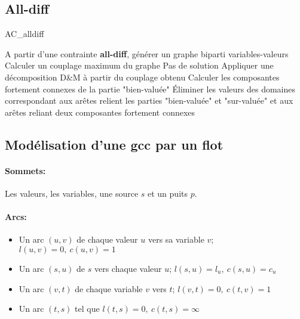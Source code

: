 \documentclass[a4paper,)11pt]{article}
\begin{document}
\subsection*{All-diff}
\begin{algorithm}[H]
\caption{AC\_alldiff}
\label{AC_ad}
\begin{algorithmic}
\STATE A partir d'une contrainte \textbf{all-diff}, générer un graphe biparti variables-valeurs
\STATE Calculer un couplage maximum du graphe
\STATE Pas de solution
\ENDIF
\STATE Appliquer une décomposition D\&M à partir du couplage obtenu
\STATE Calculer les composantes fortement connexes de la partie "bien-valuée"
\STATE Éliminer les valeurs des domaines correspondant aux arêtes relient les parties "bien-valuée" et "sur-valuée" et aux arêtes reliant deux composantes fortement connexes
\end{algorithmic}
\end{algorithm}

\subsection*{Modélisation d'une gcc par un flot}

\paragraph{Sommets:}
Les valeurs, les variables, une source $s$ et un puits $p$.

\paragraph{Arcs:}
\begin{itemize}
\item Un arc $(u,v)$ de chaque valeur $u$ vers sa variable $v$; $l(u,v)=0,\ c(u,v)=1$
\item Un arc $(s,u)$ de $s$ vers chaque valeur $u$; $l(s,u)=l_u,\ c(s,u)=c_u$
\item Un arc $(v,t)$ de chaque variable $v$ vers $t$; $l(v,t)=0,\ c(t,v)=1$
\item Un arc $(t,s)$ tel que $l(t,s)=0,\ c(t,s)= \infty$
\end{itemize}
\end{document}
